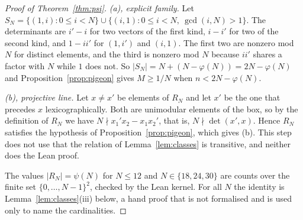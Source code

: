 \documentclass[11pt]{amsart}
\theoremstyle{definition}
\theoremstyle{remark}
\begin{document}
\begin{proof}[Proof of Theorem~\ref{thm:psi}]
\emph{(a), explicit family.} Let $S_N=\{(1,i):0\le i<N\}\cup\{(i,1):0\le i<N,\ \gcd(i,N)>1\}$. The determinants are $i'-i$ for two vectors of the first kind, $i-i'$ for two of the second kind, and $1-ii'$ for $(1,i')$ and $(i,1)$. The first two are nonzero mod $N$ for distinct elements, and the third is nonzero mod $N$ because $ii'$ shares a factor with $N$ while $1$ does not. So $|S_N|=N+(N-\varphi(N))=2N-\varphi(N)$ and Proposition~\ref{prop:pigeon} gives $M\ge1/N$ when $n<2N-\varphi(N)$.

\emph{(b), projective line.} Let $x\ne x'$ be elements of $R_N$ and let $x'$ be the one that precedes $x$ lexicographically. Both are unimodular elements of the box, so by the definition of $R_N$ we have $N\nmid x_1'x_2-x_1x_2'$, that is, $N\nmid\det(x',x)$. Hence $R_N$ satisfies the hypothesis of Proposition~\ref{prop:pigeon}, which gives (b). This step does not use that the relation of Lemma~\ref{lem:classes} is transitive, and neither does the Lean proof.

The values $|R_N|=\psi(N)$ for $N\le12$ and $N\in\{18,24,30\}$ are counts over the finite set $\{0,\dots,N-1\}^2$, checked by the Lean kernel. For all $N$ the identity is Lemma~\ref{lem:classes}(iii) below, a hand proof that is not formalised and is used only to name the cardinalities.
\end{proof}
\end{document}
